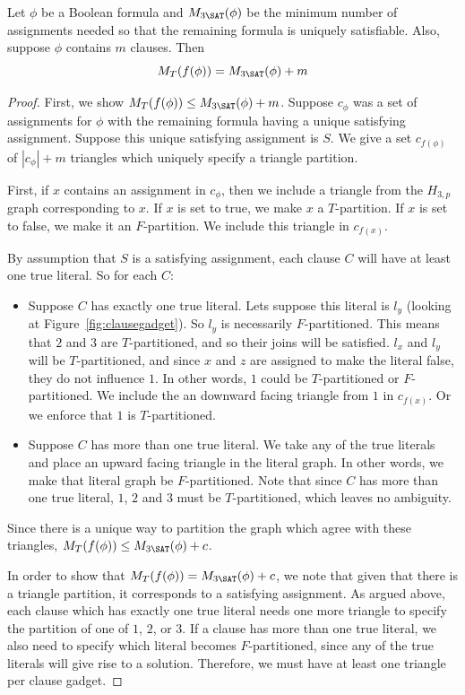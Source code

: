 \documentclass[runningheads,a4paper]{llncs}
\begin{document}
\begin{lemma}
Let $\phi$ be a Boolean formula and $M_{3\SAT}(\phi)$ be the minimum number of assignments needed so that the remaining formula is uniquely satisfiable. Also, suppose $\phi$ contains $m$ clauses. Then
\[ M_T(f(\phi)) = M_{3\SAT}(\phi) + m \]
\end{lemma}

\begin{proof}
First, we show $M_T(f(\phi)) \leq M_{3\SAT}(\phi) + m$. Suppose $c_\phi$ was a set of assignments for $\phi$ with the remaining formula having a unique satisfying assignment. Suppose this unique satisfying assignment is $S$. We give a set $c_{f(\phi)}$ of $|c_\phi| + m$ triangles which uniquely specify a triangle partition. 

First, if $x$ contains an assignment in $c_\phi$, then we include a triangle from the $H_{3,p}$ graph corresponding to $x$. If $x$ is set to true, we make $x$ a $T$-partition. If $x$ is set to false, we make it an $F$-partition. We include this triangle in $c_{f(x)}$. 

By assumption that $S$ is a satisfying assignment, each clause $C$ will have at least one true literal. So for each $C$:
\begin{itemize}
\item Suppose $C$ has exactly one true literal. Lets suppose this literal is $l_y$ (looking at Figure~\ref{fig:clausegadget}). So $l_y$ is necessarily $F$-partitioned. This means that $2$ and $3$ are $T$-partitioned, and so their joins will be satisfied. $l_x$ and $l_y$ will be $T$-partitioned, and since $x$ and $z$ are assigned to make the literal false, they do not influence $1$. In other words, $1$ could be $T$-partitioned or $F$-partitioned. We include the an downward facing triangle from $1$ in $c_{f(x)}$. Or we enforce that $1$ is $T$-partitioned.
\item Suppose $C$ has more than one true literal. We take any of the true literals and place an upward facing triangle in the literal graph. In other words, we make that literal graph be $F$-partitioned. Note that since $C$ has more than one true literal, $1$, $2$ and $3$ must be $T$-partitioned, which leaves no ambiguity. 
\end{itemize}
Since there is a unique way to partition the graph which agree with these triangles, $M_{T}(f(\phi)) \leq M_{3\SAT}(\phi) + c$. 

In order to show that $M_T(f(\phi)) = M_{3\SAT}(\phi) + c$, we note that given that there is a triangle partition, it corresponds to a satisfying assignment. As argued above, each clause which has exactly one true literal needs one more triangle to specify the partition of one of $1$, $2$, or $3$. If a clause has more than one true literal, we also need to specify which literal becomes $F$-partitioned, since any of the true literals will give rise to a solution. Therefore, we must have at least one triangle per clause gadget. 


\end{proof}
\end{document}
